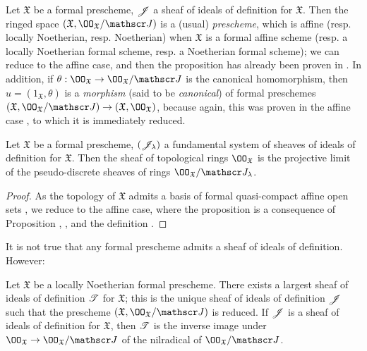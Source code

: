 \begin{env}[10.5.2]
\label{1.10.5.2}
Let $\mathfrak{X}$ be a formal prescheme, $\mathscr{J}$ a sheaf of ideals of definition for $\mathfrak{X}$.
Then the ringed space $(\mathfrak{X},\OO_\mathfrak{X}/\sh{J})$ is a (usual) \emph{prescheme}, which is affine (resp. locally Noetherian, resp. Noetherian) when $\mathfrak{X}$ is a formal affine scheme (resp. a locally Noetherian formal scheme, resp. a Noetherian formal scheme);  we can reduce to the affine case, and then the proposition has already been proven in .
In addition, if $\theta:\OO_\mathfrak{X}\to\OO_\mathfrak{X}/\sh{J}$ is the canonical homomorphism, then $u=(1_\mathfrak{X},\theta)$ is a \emph{morphism} (said to be \emph{canonical}) of formal preschemes $(\mathfrak{X},\OO_\mathfrak{X}/\sh{J})\to(\mathfrak{X},\OO_\mathfrak{X})$, because again, this was proven in the affine case , to which it is immediately reduced.
\end{env}

\begin{prop}[10.5.3]
\label{1.10.5.3}
Let $\mathfrak{X}$ be a formal prescheme, $(\mathscr{J}_\lambda)$ a fundamental system of sheaves of ideals of definition for $\mathfrak{X}$.
Then the sheaf of topological rings $\OO_\mathfrak{X}$ is the projective limit of the pseudo-discrete sheaves of rings  $\OO_\mathfrak{X}/\sh{J}_\lambda$.
\end{prop}

\begin{proof}
\label{proof-1.10.5.3}
As the topology of $\mathfrak{X}$ admits a basis of formal quasi-compact affine open sets , we reduce to the affine case, where the proposition is a consequence of Proposition , , and the definition .
\end{proof}

It is not true that any formal prescheme admits a sheaf of ideals of definition.
However:
\begin{prop}[10.5.4]
\label{1.10.5.4}
Let $\mathfrak{X}$ be a locally Noetherian formal prescheme.
There exists a largest sheaf of ideals of definition $\mathscr{T}$ for $\mathfrak{X}$; this is the unique sheaf of ideals of definition $\mathscr{J}$ such that the prescheme $(\mathfrak{X},\OO_\mathfrak{X}/\sh{J})$ is reduced.
If $\mathscr{J}$ is a sheaf of ideals of definition for $\mathfrak{X}$, then $\mathscr{T}$ is the inverse image under $\OO_\mathfrak{X}\to\OO_\mathfrak{X}/\sh{J}$ of the nilradical of $\OO_\mathfrak{X}/\sh{J}$.
\end{prop}

